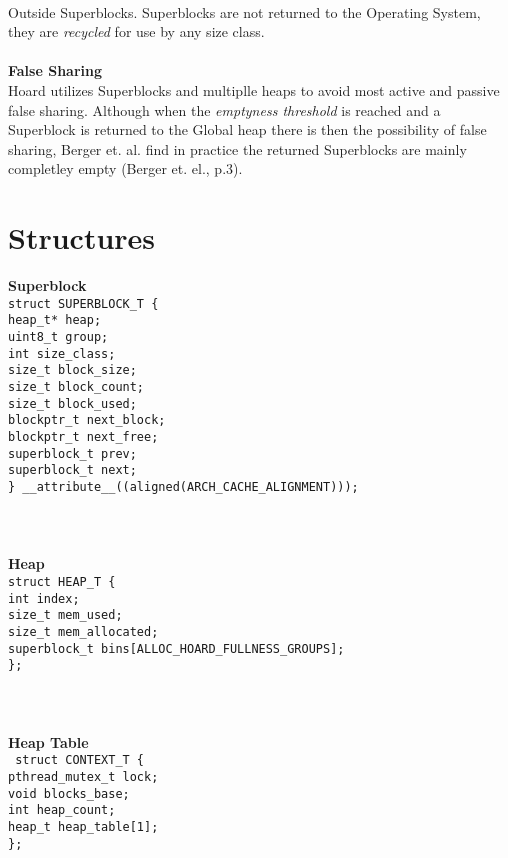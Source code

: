 \documentclass{article}
\begin{document}
\\
\indent Outside Superblocks.  Superblocks are not returned to the Operating System, they are \textit{recycled} for use by any size class.
\\
\\
\textbf{False Sharing}
\\
\indent Hoard utilizes Superblocks and multiplle heaps to avoid most active and passive false sharing.  Although when the \textit{emptyness threshold} is reached and a Superblock is returned to the Global heap there is then the possibility of false sharing, Berger et. al. find in practice the returned Superblocks are mainly completley empty (Berger et. el., p.3).

\newpage

\section{Structures}

\textbf{Superblock}
\texttt{
\\
struct SUPERBLOCK\_T \{
\\
\indent   heap\_t* heap;
\\
\indent   uint8\_t group;
\\
\indent    int size\_class;
\\
\indent    size\_t block\_size;
\\
\indent    size\_t block\_count;
\\
\indent    size\_t block\_used;
\\
\indent    blockptr\_t next\_block;
\\
\indent    blockptr\_t next\_free;
\\
\indent    superblock\_t\* prev;
\\
\indent    superblock\_t\* next;
\\
\} \_\_attribute\_\_((aligned(ARCH\_CACHE\_ALIGNMENT)));
}
\\
\\
\\
\\
\noindent \textbf{Heap}
\\
\texttt{struct HEAP\_T \{
\\
\indent    int index;
\\
\indent    size\_t mem\_used;
\\
 \indent   size\_t mem\_allocated;
\\
 \indent   superblock\_t\* bins[ALLOC\_HOARD\_FULLNESS\_GROUPS];
\\
\};}
\\
\\
\\
\\
\noindent \textbf{Heap Table}
\\
\texttt{
struct CONTEXT\_T \{
\\
\indent    pthread\_mutex\_t lock;
\\
\indent    void\* blocks\_base;
\\
\indent    int heap\_count;
\\
 \indent   heap\_t heap\_table[1];
\\
\};}
\end{document}
